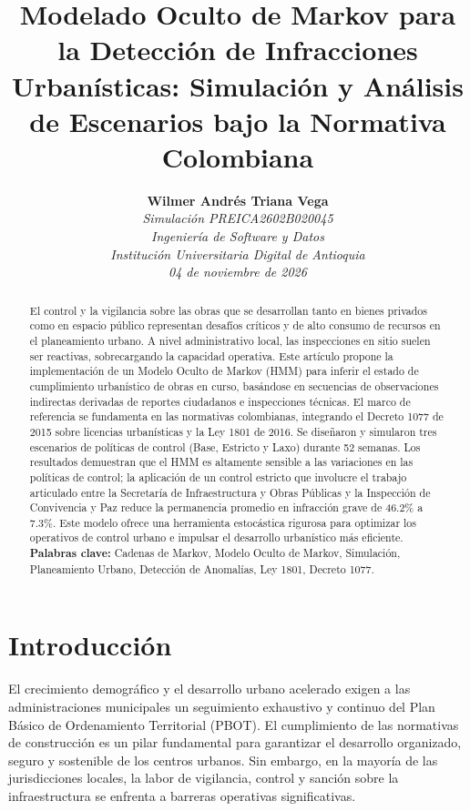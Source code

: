 \documentclass[12pt,letterpaper]{article}
\title{\textbf{Modelado Oculto de Markov para la Detección de Infracciones Urbanísticas: Simulación y Análisis de Escenarios bajo la Normativa Colombiana}}
\author{
\textbf{Wilmer Andrés Triana Vega} \\
\textit{Simulación PREICA2602B020045} \\
\textit{Ingeniería de Software y Datos} \\
\textit{Institución Universitaria Digital de Antioquia} \\
\textit{04 de noviembre de 2026}
}
\date{}
\begin{document}
\maketitle

\begin{abstract}
\noindent El control y la vigilancia sobre las obras que se desarrollan tanto en bienes privados como en espacio público representan desafíos críticos y de alto consumo de recursos en el planeamiento urbano. A nivel administrativo local, las inspecciones en sitio suelen ser reactivas, sobrecargando la capacidad operativa. Este artículo propone la implementación de un Modelo Oculto de Markov (HMM) para inferir el estado de cumplimiento urbanístico de obras en curso, basándose en secuencias de observaciones indirectas derivadas de reportes ciudadanos e inspecciones técnicas. El marco de referencia se fundamenta en las normativas colombianas, integrando el Decreto 1077 de 2015 sobre licencias urbanísticas y la Ley 1801 de 2016. Se diseñaron y simularon tres escenarios de políticas de control (Base, Estricto y Laxo) durante 52 semanas. Los resultados demuestran que el HMM es altamente sensible a las variaciones en las políticas de control; la aplicación de un control estricto que involucre el trabajo articulado entre la Secretaría de Infraestructura y Obras Públicas y la Inspección de Convivencia y Paz reduce la permanencia promedio en infracción grave de 46.2\% a 7.3\%. Este modelo ofrece una herramienta estocástica rigurosa para optimizar los operativos de control urbano e impulsar el desarrollo urbanístico más eficiente.
\vspace{0.5cm} \\
\textbf{Palabras clave:} Cadenas de Markov, Modelo Oculto de Markov, Simulación, Planeamiento Urbano, Detección de Anomalías, Ley 1801, Decreto 1077.
\end{abstract}

\newpage

\section{Introducción}
El crecimiento demográfico y el desarrollo urbano acelerado exigen a las administraciones municipales un seguimiento exhaustivo y continuo del Plan Básico de Ordenamiento Territorial (PBOT). El cumplimiento de las normativas de construcción es un pilar fundamental para garantizar el desarrollo organizado, seguro y sostenible de los centros urbanos. Sin embargo, en la mayoría de las jurisdicciones locales, la labor de vigilancia, control y sanción sobre la infraestructura se enfrenta a barreras operativas significativas.
\end{document}
